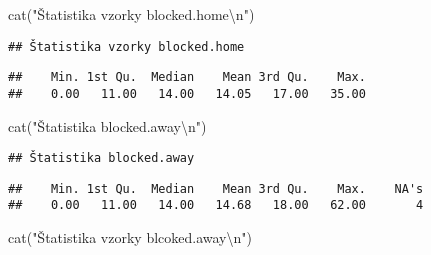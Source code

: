 \documentclass[
]{article}
\newenvironment{Shaded}{\begin{snugshade}}{\end{snugshade}}
\newcommand{\FunctionTok}[1]{\textcolor[rgb]{0.00,0.00,0.00}{#1}}
\newcommand{\NormalTok}[1]{#1}
\newcommand{\SpecialCharTok}[1]{\textcolor[rgb]{0.00,0.00,0.00}{#1}}
\newcommand{\StringTok}[1]{\textcolor[rgb]{0.31,0.60,0.02}{#1}}
\begin{document}
\begin{Shaded}
\begin{Highlighting}[]
\FunctionTok{cat}\NormalTok{(}\StringTok{"Štatistika vzorky blocked.home}\SpecialCharTok{\textbackslash{}n}\StringTok{"}\NormalTok{)}
\end{Highlighting}
\end{Shaded}

\begin{verbatim}
## Štatistika vzorky blocked.home
\end{verbatim}

\begin{Shaded}
\end{Shaded}

\begin{verbatim}
##    Min. 1st Qu.  Median    Mean 3rd Qu.    Max. 
##    0.00   11.00   14.00   14.05   17.00   35.00
\end{verbatim}

\begin{Shaded}
\begin{Highlighting}[]
\FunctionTok{cat}\NormalTok{(}\StringTok{"Štatistika blocked.away}\SpecialCharTok{\textbackslash{}n}\StringTok{"}\NormalTok{)}
\end{Highlighting}
\end{Shaded}

\begin{verbatim}
## Štatistika blocked.away
\end{verbatim}

\begin{Shaded}
\end{Shaded}

\begin{verbatim}
##    Min. 1st Qu.  Median    Mean 3rd Qu.    Max.    NA's 
##    0.00   11.00   14.00   14.68   18.00   62.00       4
\end{verbatim}

\begin{Shaded}
\begin{Highlighting}[]
\FunctionTok{cat}\NormalTok{(}\StringTok{"Štatistika vzorky blcoked.away}\SpecialCharTok{\textbackslash{}n}\StringTok{"}\NormalTok{)}
\end{Highlighting}
\end{Shaded}
\end{document}
